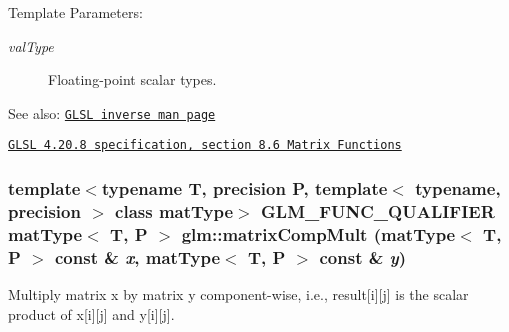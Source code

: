 \begin{Desc}
\item[Template Parameters:]
\begin{description}
\item[{\em valType}]Floating-point scalar types.\end{description}
\end{Desc}
\begin{Desc}
\item[See also:]\href{http://www.opengl.org/sdk/docs/manglsl/xhtml/inverse.xml}{\tt GLSL inverse man page} 

\href{http://www.opengl.org/registry/doc/GLSLangSpec.4.20.8.pdf}{\tt GLSL 4.20.8 specification, section 8.6 Matrix Functions} \end{Desc}
\hypertarget{group__core__func__matrix_g30bbe46a821497b9ae0c63a2d27db0b2}{
\subsubsection[matrixCompMult]{\setlength{\rightskip}{0pt plus 5cm}template$<$typename T, precision P, template$<$ typename, precision $>$ class matType$>$ GLM\_\-FUNC\_\-QUALIFIER matType$<$ T, P $>$ glm::matrixCompMult (matType$<$ T, P $>$ const \& {\em x}, \/  matType$<$ T, P $>$ const \& {\em y})}}
\label{group__core__func__matrix_g30bbe46a821497b9ae0c63a2d27db0b2}


Multiply matrix x by matrix y component-wise, i.e., result\mbox{[}i\mbox{]}\mbox{[}j\mbox{]} is the scalar product of x\mbox{[}i\mbox{]}\mbox{[}j\mbox{]} and y\mbox{[}i\mbox{]}\mbox{[}j\mbox{]}.

